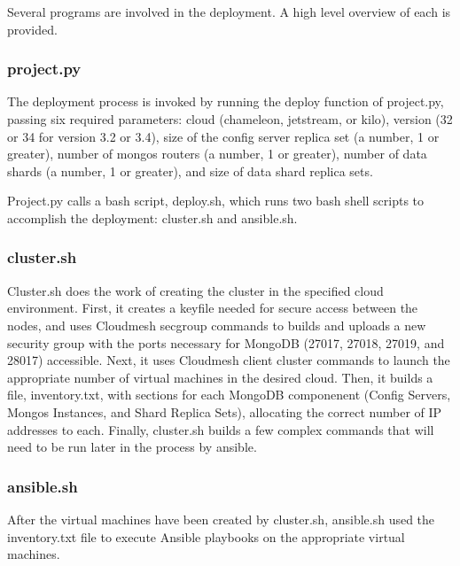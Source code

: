 \documentclass[9pt,twocolumn,twoside]{../../styles/osajnl}
\begin{document}
Several programs are involved in the deployment.  A high level overview of each is provided.

\subsubsection{project.py}

The deployment process is invoked by running the deploy function of project.py, passing six required parameters: cloud (chameleon, jetstream, or kilo), version (32 or 34 for version 3.2 or 3.4), size of the config server replica set (a number, 1 or greater), number of mongos routers (a number, 1 or greater), number of data shards (a number, 1 or greater), and size of data shard replica sets.

Project.py calls a bash script, deploy.sh, which runs two bash shell scripts to accomplish the deployment: cluster.sh and ansible.sh.

\subsubsection{cluster.sh}

Cluster.sh does the work of creating the cluster in the specified cloud environment.  First, it creates a keyfile needed for secure access between the nodes, and uses Cloudmesh secgroup commands to builds and uploads a new security group with the ports necessary for MongoDB (27017, 27018, 27019, and 28017) accessible.  Next, it uses Cloudmesh client cluster commands to launch the appropriate number of virtual machines in the desired cloud.  Then, it builds a file, inventory.txt, with sections for each MongoDB componenent (Config Servers, Mongos Instances, and Shard Replica Sets), allocating the correct number of IP addresses to each.  Finally, cluster.sh builds a few complex commands that will need to be run later in the process by ansible.

\subsubsection{ansible.sh}

After the virtual machines have been created by cluster.sh, ansible.sh used the inventory.txt file to execute Ansible playbooks on the appropriate virtual machines.
\end{document}

